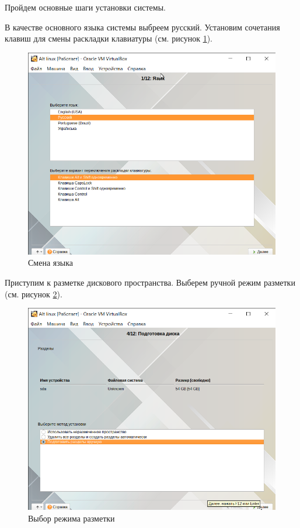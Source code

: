 \documentclass[a4paper,14pt]{extarticle}
\begin{document}
Пройдем основные шаги установки системы.

В качестве основного языка системы выбреем русский. Установим сочетания клавиш для смены раскладки клавиатуры (см. рисунок \ref{fig:language}).
	
\begin{figure}[h!]
	\centering
	\includegraphics[width=0.7\linewidth]{"images/Практика МИРЭА/Alt linux [Работает] - Oracle VM VirtualBox 18.03.2022 14_51_32"}
	\caption{Смена языка}
	\label{fig:language}
\end{figure}


Приступим к разметке дискового пространства. Выберем ручной режим разметки (см. рисунок \ref{fig:mount-mode}). 


\begin{figure}[h!]
	\centering
	\includegraphics[width=0.7\linewidth]{"images/Практика МИРЭА/Alt linux [Работает] - Oracle VM VirtualBox 18.03.2022 14_52_28"}
	\caption{Выбор режима разметки}
	\label{fig:mount-mode}
\end{figure}
\end{document}
